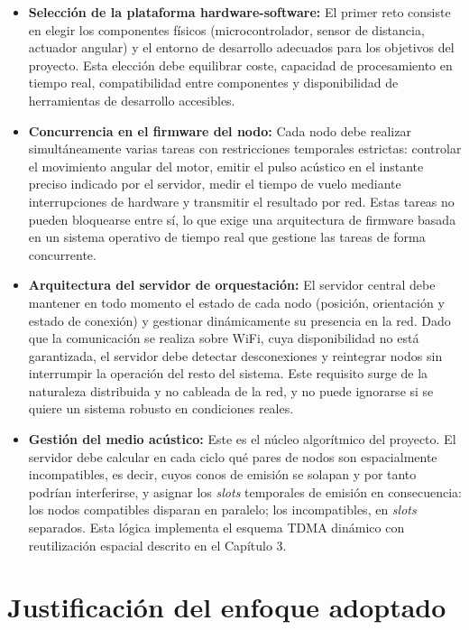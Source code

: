 \begin{itemize}[leftmargin=*, label=\textbullet]
    \item \textbf{Selección de la plataforma hardware-software:} El primer reto consiste en elegir los componentes físicos (microcontrolador, sensor de distancia, actuador angular) y el entorno de desarrollo adecuados para los objetivos del proyecto. Esta elección debe equilibrar coste, capacidad de procesamiento en tiempo real, compatibilidad entre componentes y disponibilidad de herramientas de desarrollo accesibles.

    \item \textbf{Concurrencia en el firmware del nodo:} Cada nodo debe realizar simultáneamente varias tareas con restricciones temporales estrictas: controlar el movimiento angular del motor, emitir el pulso acústico en el instante preciso indicado por el servidor, medir el tiempo de vuelo mediante interrupciones de hardware y transmitir el resultado por red. Estas tareas no pueden bloquearse entre sí, lo que exige una arquitectura de firmware basada en un sistema operativo de tiempo real que gestione las tareas de forma concurrente.

    \item \textbf{Arquitectura del servidor de orquestación:} El servidor central debe mantener en todo momento el estado de cada nodo (posición, orientación y estado de conexión) y gestionar dinámicamente su presencia en la red. Dado que la comunicación se realiza sobre WiFi, cuya disponibilidad no está garantizada, el servidor debe detectar desconexiones y reintegrar nodos sin interrumpir la operación del resto del sistema. Este requisito surge de la naturaleza distribuida y no cableada de la red, y no puede ignorarse si se quiere un sistema robusto en condiciones reales.

    \item \textbf{Gestión del medio acústico:} Este es el núcleo algorítmico del proyecto. El servidor debe calcular en cada ciclo qué pares de nodos son espacialmente incompatibles, es decir, cuyos conos de emisión se solapan y por tanto podrían interferirse, y asignar los \textit{slots} temporales de emisión en consecuencia: los nodos compatibles disparan en paralelo; los incompatibles, en \textit{slots} separados. Esta lógica implementa el esquema TDMA dinámico con reutilización espacial descrito en el Capítulo 3.
\end{itemize}

\section{Justificación del enfoque adoptado}

